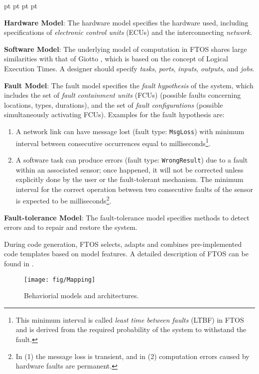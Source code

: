 \documentclass[10pt, a4paper, onecolumn, conference, compsocconf]{IEEEtran}
\newenvironment{list1}{\begin{list}{}
{\topsep 0 pt \parsep 0 pt \partopsep 0 pt \itemsep 0
pt}}{\end{list}}
\begin{document}
\begin{list1}
    \item \textbf{Hardware Model}: The hardware model specifies the hardware used, including specifications of \emph{electronic control units} (ECUs) and the interconnecting \emph{network}.
    \item \textbf{Software Model}: The underlying model of computation in FTOS shares large similarities with that of Giotto \cite{Henzinger01giotto:a}, which is based on the concept of Logical Execution Times. A designer should specify \emph{tasks}, \emph{ports}, \emph{inputs}, \emph{outputs}, and \emph{jobs}.
    \item \textbf{Fault Model}: The fault model specifies the \emph{fault hypothesis} of the system, which includes the set of \emph{fault containment units} (FCUs) (possible faults concerning locations, types, durations), and the set of \emph{fault configurations}
                                (possible simultaneously activating FCUs). Examples for the fault hypothesis are:
                                \begin{enumerate}
\item A network link can have message lost (fault type: \verb"MsgLoss") with minimum interval between consecutive occurrences equal to  milliseconds\footnote{This minimum interval is called \emph{least time between faults} (LTBF) in FTOS and is derived from the required probability of the system to withstand the fault.}.
\item A software task can produce errors (fault type: \verb"WrongResult") due to a fault within an associated sensor; once happened, it will not be corrected unless explicitly done by the user or the fault-tolerant mechanism. The minimum interval for the correct operation between two consecutive faults of the sensor is expected to be  milliseconds\footnote{In (1) the message loss is transient, and in (2) computation errors caused by hardware faults are permanent.}.
\end{enumerate}
    \item \textbf{Fault-tolerance Model}: The fault-tolerance model specifies methods to detect errors and to repair and restore the system.
\end{list1}

During code generation, FTOS selects, adapts and combines pre-implemented code templates based on model features. A detailed description of FTOS can be found in \cite{buckl:2008}.

\begin{figure}
 \centering
 \texttt{[image: fig/Mapping]}
 \caption{Behaviorial models and architectures.}
 \label{fig:Mapping}
\end{figure}
\end{document}
